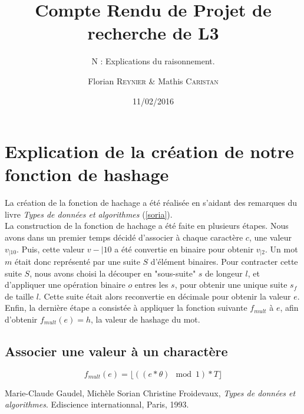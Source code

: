 \documentclass[final,twoside,article,10pt]{scrartcl}
\begin{document}
%
\title{Compte Rendu de Projet de recherche de L3}
\subtitle{N : Explications du raisonnement.}
\author{Florian \textsc{Reynier} \& Mathis \textsc{Caristan}}
%
\date{11/02/2016}

\maketitle

\section{Explication de la création de notre fonction de hashage}
    La création de la fonction de hachage a été réalisée en s'aidant des remarques du livre \emph{Types de données et algorithmes} (\ref{soria}).\\
    La construction de la fonction de hachage a été faite en plusieurs étapes. Nous avons dans un premier temps décidé d'associer à chaque caractère $c$, une valeur $v_{|10}$. Puis, cette valeur $v-{|10}$ a été convertie en binaire pour obtenir $v_{|2}$. Un mot $m$ était donc représenté par une suite $S$ d'élément binaires. Pour contracter cette suite $S$, nous avons choisi la découper en "sous-suite" $s$ de longeur $l$, et d'appliquer une opération binaire $o$ entres les $s$, pour obtenir une unique suite $s_f$ de taille $l$. Cette suite était alors reconvertie en décimale pour obtenir la valeur $e$. Enfin, la dernière étape a consistée à appliquer la fonction suivante $f_{mult}$ à $e$, afin d'obtenir $f_{mult}(e) = h$, la valeur de hashage du mot.
    \subsection{Associer une valeur à un charactère}
    \begin{equation}
        f_{mult}(e) = \lfloor ( (e*\theta) \mod 1) * T \rfloor
    \end{equation}

    \begin{thebibliography}
        Marie-Claude Gaudel, Michèle Sorian Christine Froidevaux, \emph{Types de données et algorithmes}. Ediscience internationnal, Paris, 1993.
\end{thebibliography}
\end{document}
